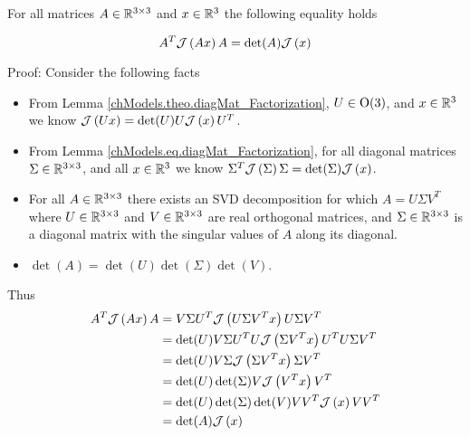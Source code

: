 \begin{genMat_Factorization}
\label{chModels.theo.genMat_Factorization}
For all matrices $A\in\mathbb{R}^{3\times 3}$ and $x\in\mathbb{R}^{3}$ the
following equality holds

\begin{equation}
\label{chModels.eq.genMat_Factorization}
A^T\mathcal{J}\left( Ax \right)A=\det(A)\mathcal{J}\left( x \right)
\end{equation}

\end{genMat_Factorization}

Proof:
%
Consider the following facts
%
\begin{itemize}
%
\item From Lemma \ref{chModels.theo.diagMat_Factorization}, $U\in\O3$, and
  $x\in\mathbb{R}^{3}$ we know $\mathcal{J}\left( U x \right)=\det(U) U\mathcal{J}\left( x \right)U^T$.
\item From Lemma \ref{chModels.eq.diagMat_Factorization}, for all
  diagonal matrices $\Sigma\in\mathbb{R}^{3\times 3}$, and all $x\in\mathbb{R}^{3}$
  we know $\Sigma^T\mathcal{J}\left( \Sigma \right)\Sigma=\det(\Sigma)\mathcal{J}\left( x \right)$.
%
\item For all $A\in\mathbb{R}^{3\times 3}$ there exists an SVD decomposition
  for which $A=U\Sigma V^T$ where $U\in\mathbb{R}^{3\times 3}$ and
  $V\in\mathbb{R}^{3\times 3}$ are real orthogonal matrices, and
  $\Sigma\in\mathbb{R}^{3\times 3}$ is a diagonal matrix with the singular
  values of $A$ along its diagonal.
%
\item $\det(A)=\det(U)\det(\Sigma)\det(V)$.
%
\end{itemize}
%
Thus
%
\begin{align}
A^T\mathcal{J}\left( Ax \right)A&=V \Sigma U^T \mathcal{J}\left( U \Sigma V^T x \right) U \Sigma V^T
\nonumber \\
&=\det(U)V \Sigma U^TU \mathcal{J}\left( \Sigma V^T x \right)U^TU\Sigma V^T
\nonumber \\
&=\det(U)V \Sigma \mathcal{J}\left( \Sigma V^T x \right)\Sigma V^T
\nonumber \\
&=\det(U)\det(\Sigma) V \mathcal{J}\left( V^T x \right) V^T
\nonumber \\
&=\det(U)\det(\Sigma)\det(V) V V^T \mathcal{J}\left( x \right)V V^T
\nonumber \\
&=\det(A)\mathcal{J}\left( x \right)
\end{align}



